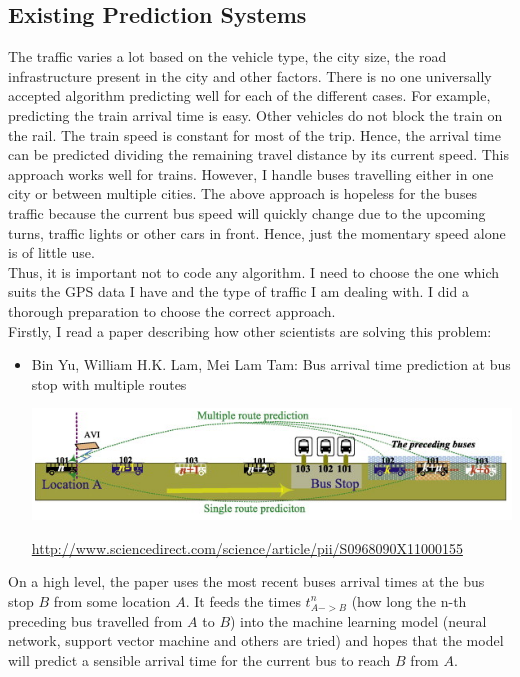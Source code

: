 \documentclass[12pt,a4paper,oneside,openright]{report}
\begin{document}
\subsection{Existing Prediction Systems}

The traffic varies a lot based on the vehicle type, the city size, the road
infrastructure present in the city and other factors. There is no one universally
accepted algorithm predicting well for each of the different cases. For example, predicting
the train arrival time is easy. Other vehicles do not block the train on the rail. The train
speed is constant for most of the trip. Hence, the arrival time can be predicted dividing the
remaining travel distance by its current speed. This approach works well for trains. However,
I handle buses travelling either in one city or between multiple cities. The above
approach is hopeless for the buses traffic because the current bus speed will quickly
change due to the upcoming turns, traffic lights or other cars in front. Hence, just the
momentary speed alone is of little use. \\

Thus, it is important not to code any algorithm. I need to choose the one which suits
the GPS data I have and the type of traffic I am dealing with. I did a thorough preparation
to choose the correct approach. \\

Firstly, I read a paper describing how other scientists are solving this problem:

\begin{itemize}

\item Bin Yu, William H.K. Lam, Mei Lam Tam: Bus arrival time prediction at
bus stop with multiple routes 

\includegraphics[width=\textwidth]{figs/paper.png}

\textcolor{blue}{\url{http://www.sciencedirect.com/science/article/pii/S0968090X11000155}}

\end{itemize}

On a high level, the paper uses the most recent buses arrival times at the bus stop $B$
from some location $A$. It feeds the times $t^{n}_{A->B}$ (how long the n-th
preceding bus travelled from $A$ to $B$) into the machine learning model (neural network,
support vector machine and others are tried) and hopes that the model will predict a
sensible arrival time for the current bus to reach $B$ from $A$. \\
\end{document}

